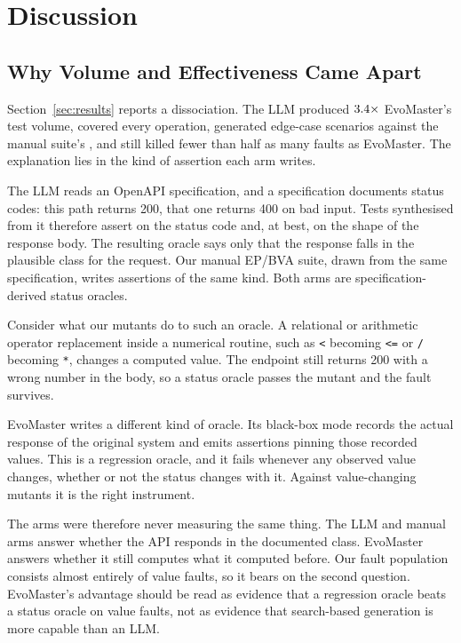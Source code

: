 \section{Discussion}
\label{sec:discussion}

\subsection{Why Volume and Effectiveness Came Apart}

Section~\ref{sec:results} reports a dissociation. The LLM produced
$3.4\times$ EvoMaster's test volume, covered every operation, generated
\RQIIItotalLlm{} edge-case scenarios against the manual suite's \RQIIItotalManual{}, and still
killed fewer than half as many faults as EvoMaster. The explanation lies in the kind of
assertion each arm writes.

The LLM reads an OpenAPI specification, and a specification documents status codes: this path
returns 200, that one returns 400 on bad input. Tests synthesised from it therefore assert on
the status code and, at best, on the shape of the response body. The resulting oracle says
only that the response falls in the plausible class for the request. Our manual EP/BVA suite,
drawn from the same specification, writes assertions of the same kind. Both arms are
specification-derived status oracles.

Consider what our mutants do to such an oracle. A relational or arithmetic operator
replacement inside a numerical routine, such as \texttt{<} becoming \texttt{<=} or \texttt{/}
becoming \texttt{*}, changes a computed value. The endpoint still returns 200 with a wrong
number in the body, so a status oracle passes the mutant and the fault survives.

EvoMaster writes a different kind of oracle. Its black-box mode records the actual response of
the original system and emits assertions pinning those recorded values. This is a regression
oracle, and it fails whenever any observed value changes, whether or not the status changes
with it. Against value-changing mutants it is the right instrument.

The arms were therefore never measuring the same thing. The LLM and manual arms answer whether
the API responds in the documented class. EvoMaster answers whether it still computes what it
computed before. Our fault population consists almost entirely of value faults, so it bears on
the second question. EvoMaster's advantage should be read as evidence that a regression oracle
beats a status oracle on value faults, not as evidence that search-based generation is more
capable than an LLM.

